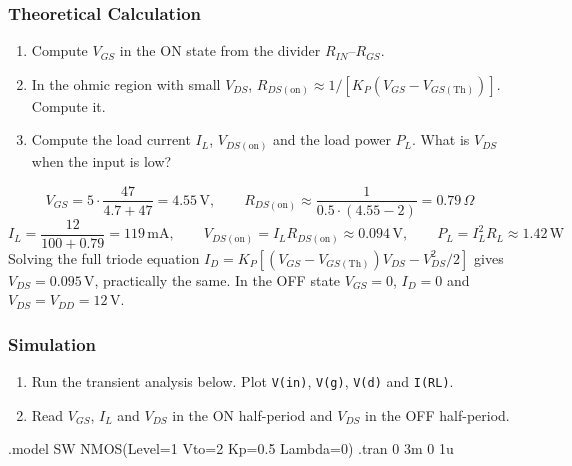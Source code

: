 \subsubsection*{Theoretical Calculation}
\begin{enumerate}[itemsep=2pt]
  \item Compute $V_{GS}$ in the ON state from the divider $R_{IN}$--$R_{GS}$.
  \item In the ohmic region with small $V_{DS}$, $R_{DS(\mathrm{on})} \approx 1/[K_P(V_{GS}-V_{GS(\mathrm{Th})})]$. Compute it.
  \item Compute the load current $I_L$, $V_{DS(\mathrm{on})}$ and the load power $P_L$. What is $V_{DS}$ when the input is low?
\end{enumerate}
\begin{solution}
\[
  V_{GS} = 5\cdot\frac{47}{4.7+47} = 4.55\,\mathrm{V},\qquad
  R_{DS(\mathrm{on})} \approx \frac{1}{0.5\cdot(4.55-2)} = 0.79\,\Omega
\]
\[
  I_L = \frac{12}{100+0.79} = 119\,\mathrm{mA},\qquad V_{DS(\mathrm{on})} = I_L R_{DS(\mathrm{on})} \approx 0.094\,\mathrm{V},\qquad
  P_L = I_L^2 R_L \approx 1.42\,\mathrm{W}
\]
Solving the full triode equation $I_D = K_P[(V_{GS}-V_{GS(\mathrm{Th})})V_{DS} - V_{DS}^2/2]$ gives $V_{DS} = 0.095$\,V,
practically the same. In the OFF state $V_{GS} = 0$, $I_D = 0$ and $V_{DS} = V_{DD} = 12$\,V.
\end{solution}

\subsubsection*{Simulation}
\begin{enumerate}[itemsep=2pt]
  \item Run the transient analysis below. Plot \texttt{V(in)}, \texttt{V(g)}, \texttt{V(d)} and \texttt{I(RL)}.
  \item Read $V_{GS}$, $I_L$ and $V_{DS}$ in the ON half-period and $V_{DS}$ in the OFF half-period.
\end{enumerate}
\begin{spice}
.model SW NMOS(Level=1 Vto=2 Kp=0.5 Lambda=0)
.tran 0 3m 0 1u
\end{spice}

